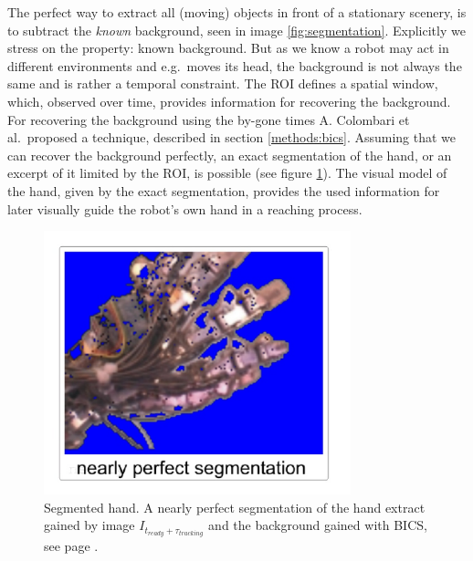 The perfect way to extract all (moving) objects in front of a stationary scenery, is to subtract the \textit{known} background, seen in image \ref{fig:segmentation}. Explicitly we stress on the property: known background. But as we know a robot may act in different environments and e.g.\ moves its head, the background is not always the same and is rather a temporal constraint. The ROI defines a spatial window, which, observed over time, provides information for recovering the background. For recovering the background using the by-gone times A. Colombari et al.\ proposed a technique, described in section \ref{methods:bics}. Assuming that we can recover the background perfectly, an exact segmentation of the hand, or an excerpt of it limited by the ROI, is possible (see figure \ref{fig:perfsegm}). The visual model of the hand, given by the exact segmentation, provides the used information for later visually guide the robot's own hand in a reaching process.
%
\begin{figure}[h]
	\begin{center}
		\includegraphics[width=3.5in]{imgs/method/perfsegm.pdf}
	\end{center}
		\caption[Segmented hand. ]{Segmented hand. A nearly perfect segmentation of the hand extract gained by image $I_{t_{ready}+\tau_{tracking}}$ and the background gained with BICS, see page \pageref{methods:bics}.}
		\label{fig:perfsegm}
\end{figure}
